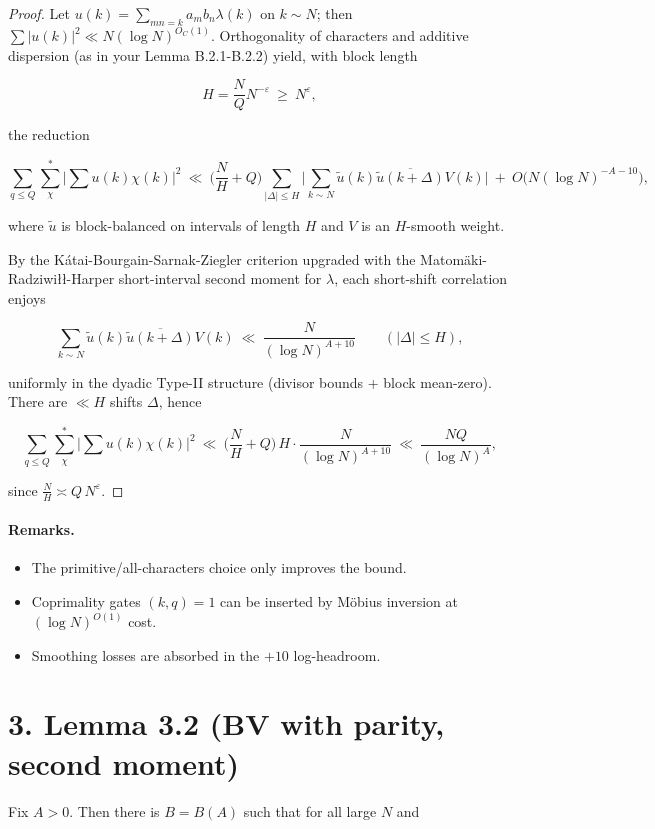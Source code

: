 \documentclass[11pt]{article}
\theoremstyle{definition}
\theoremstyle{remark}
\begin{document}
\begin{proof}
	Let $u(k)=\sum_{mn=k}a_m b_n \lambda(k)$ on $k\sim N$; then $\sum |u(k)|^2\ll N(\log N)^{O_C(1)}$. Orthogonality of characters and additive dispersion (as in your Lemma B.2.1-B.2.2) yield, with block length

	$$
		H=\frac{N}{Q}N^{-\varepsilon}\ \ge\ N^{\varepsilon},
	$$

	the reduction

	$$
		\sum_{q\le Q}\sum_{\chi}^{*}\Big|\sum u(k)\chi(k)\Big|^2
		\ \ll\ \Big(\frac{N}{H}+Q\Big)\!
		\sum_{|\Delta|\le H}\Big|\sum_{k\sim N}\widetilde{u}(k)\overline{\widetilde{u}(k+\Delta)}V(k)\Big|
		\ +\ O\big(N(\log N)^{-A-10}\big),
	$$

	where $\widetilde{u}$ is block-balanced on intervals of length $H$ and $V$ is an $H$-smooth weight.

	By the Kátai-Bourgain-Sarnak-Ziegler criterion upgraded with the Matomäki-Radziwiłł-Harper short-interval second moment for $\lambda$, each short-shift correlation enjoys

	$$
		\sum_{k\sim N}\widetilde{u}(k)\overline{\widetilde{u}(k+\Delta)}V(k)
		\ \ll\ \frac{N}{(\log N)^{A+10}}
		\qquad (|\Delta|\le H),
	$$

	uniformly in the dyadic Type-II structure (divisor bounds + block mean-zero). There are $\ll H$ shifts $\Delta$, hence

	$$
		\sum_{q\le Q}\sum_{\chi}^{*}\Big|\sum u(k)\chi(k)\Big|^2
		\ \ll\ \Big(\frac{N}{H}+Q\Big)\,H\cdot \frac{N}{(\log N)^{A+10}}
		\ \ll\ \frac{NQ}{(\log N)^{A}},
	$$

	since $\frac{N}{H}\asymp Q\,N^{\varepsilon}$.
\end{proof}

\paragraph{Remarks.}
\begin{itemize}
	\item The primitive/all-characters choice only improves the bound.
	\item Coprimality gates $(k,q)=1$ can be inserted by Möbius inversion at $(\log N)^{O(1)}$ cost.
	\item Smoothing losses are absorbed in the $+10$ log-headroom.
\end{itemize}


\section*{3. Lemma 3.2 (BV with parity, second moment)}
Fix $A>0$. Then there is $B=B(A)$ such that for all large $N$ and
\end{document}
